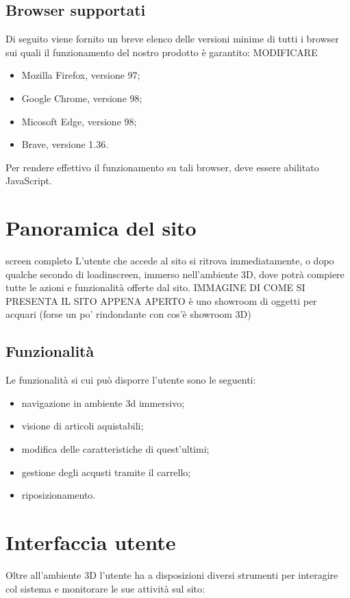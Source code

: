 \subsection{Browser supportati}
Di seguito viene fornito un breve elenco delle versioni minime di tutti i browser sui quali
il funzionamento del nostro prodotto è garantito:
MODIFICARE
\begin{itemize}
	\item Mozilla Firefox, versione 97;
	\item Google Chrome, versione 98;
	\item Micosoft Edge, versione 98;
	\item Brave, versione 1.36.
\end{itemize}
Per rendere effettivo il funzionamento su tali browser, deve essere abilitato JavaScript.
\pagebreak



\section{Panoramica del sito}
screen completo
L'utente che accede al sito si ritrova immediatamente, o dopo qualche secondo di loadinscreen, immerso nell'ambiente 3D, dove potrà compiere tutte le azioni e funzionalità offerte dal sito. 
IMMAGINE DI COME SI PRESENTA IL SITO APPENA APERTO
è uno showroom di oggetti per acquari
(forse un po' rindondante con cos'è showroom 3D)
\subsection{Funzionalità}
Le funzionalità si cui può disporre l'utente sono le seguenti:
\begin{itemize}
\item navigazione in ambiente 3d immersivo;
\item visione di articoli aquistabili;
\item modifica delle caratteristiche di quest'ultimi;
\item gestione degli acqusti tramite il carrello;
\item riposizionamento.
\end{itemize}
\pagebreak

\section{Interfaccia utente}
Oltre all'ambiente 3D l'utente ha a disposizioni diversi strumenti per interagire col sistema e monitorare le sue attività sul sito:
